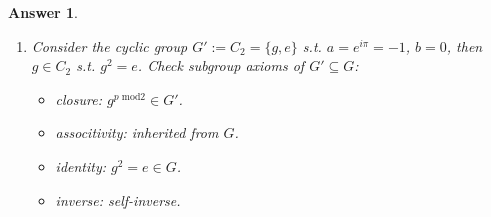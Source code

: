 \documentclass[a4paper]{article}
\newtheorem{ans}{Answer}[section]
\theoremstyle{new}
\begin{document}
\begin{ans}
\begin{enumerate}[label=(\alph*)]
\begin{itemize}
\end{itemize}
Check $f$ is a homomorphism:
\begin{align}
    f\bigg(\begin{pmatrix}a&b\\0&1\\\end{pmatrix}\begin{pmatrix}a'&b'\\0&1\\\end{pmatrix}\bigg)&=f\bigg(\begin{pmatrix}aa'&ab'b\\0&1\\\end{pmatrix}\bigg)\nonumber\\&=\begin{pmatrix}aa'&0\\0&1\\\end{pmatrix}\nonumber\\&=\begin{pmatrix}a&0\\0&1\\\end{pmatrix}\begin{pmatrix}a'&0\\0&1\\\end{pmatrix}\nonumber\\&=f\bigg(\begin{pmatrix}a&b\\0&1\\\end{pmatrix}\bigg)f\bigg(\begin{pmatrix}a'&b'\\0&1\\\end{pmatrix}\bigg)\nonumber
\end{align}
\item Consider the cyclic group $G':=C_2=\{g,e\}$ s.t. $a=e^{i\pi}=-1$, $b=0$, then $g\in C_2$ s.t. $g^2=e$. Check subgroup axioms of $G'\subseteq G$:
\begin{itemize}
    \item closure: $g^{p\text{ mod}2}\in G'$.
    \item associtivity: inherited from $G$.
    \item identity: $g^2=e\in G$.
    \item inverse: self-inverse.
\end{itemize}

\end{enumerate}
\end{ans}
\end{document}

